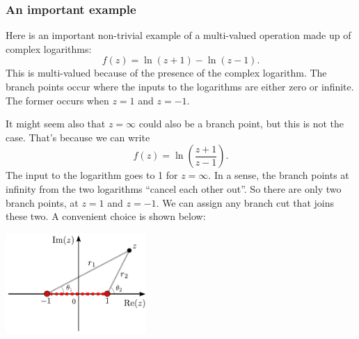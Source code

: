 \documentclass[10pt,a4paper]{article}
\begin{document}
\subsubsection{An important example}\label{an-important-example}

Here is an important non-trivial example of a multi-valued operation
made up of complex logarithms:
\begin{equation}
f(z) = \ln(z+1) - \ln(z-1).
\end{equation}
This is multi-valued because of the presence of the complex logarithm.
The branch points occur where the inputs to the logarithms are either
zero or infinite. The former occurs when $z = 1$ and $z = -1$.

It might seem also that $z = \infty$ could also be a branch point, but
this is not the case. That's because we can write
\begin{equation}
f(z) = \ln\left(\frac{z+1}{z-1}\right).
\end{equation}
The input to the logarithm goes to 1 for $z = \infty$. In a sense, the
branch points at infinity from the two logarithms ``cancel each other
out''. So there are only two branch points, at $z = 1$ and $z = -1$.
We can assign any branch cut that joins these two. A convenient choice
is shown below:

\begin{center}
  \includegraphics[width=0.4\textwidth]{branch_cut_example}
\end{center}
\end{document}
